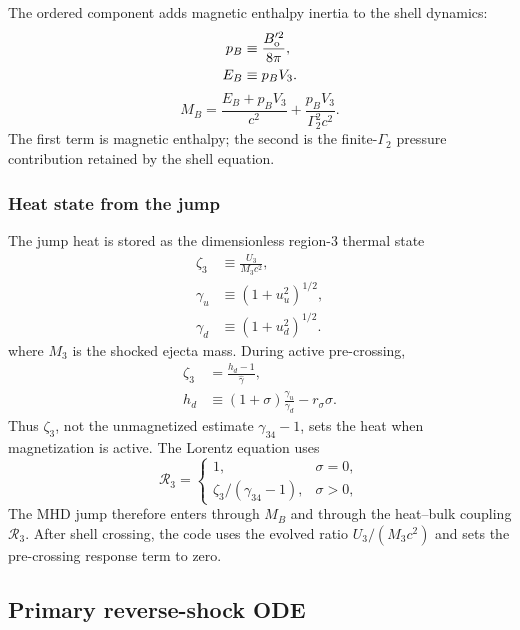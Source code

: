 \documentclass[twocolumn]{aastex702}
\begin{document}
The ordered component adds magnetic enthalpy inertia to the shell dynamics:
\begin{equation}
\begin{aligned}
p_B&\equiv \frac{B_{\rm o}^{\prime 2}}{8\pi},\\
E_B&\equiv p_BV_3 .
\end{aligned}
\end{equation}
\[
M_B=\frac{E_B+p_BV_3}{c^2}+\frac{p_BV_3}{\Gamma_2^2c^2}.
\]
The first term is magnetic enthalpy; the second is the finite-\(\Gamma_2\)
pressure contribution retained by the shell equation.

\subsubsection{Heat state from the jump}

The jump heat is stored as the dimensionless region-3 thermal state
\begin{equation}
\begin{aligned}
\zeta_3&\equiv\frac{U_3}{M_3c^2},\\
\gamma_u&\equiv(1+u_u^2)^{1/2},\\
\gamma_d&\equiv(1+u_d^2)^{1/2}.
\end{aligned}
\end{equation}
where \(M_3\) is the shocked ejecta mass.  During active pre-crossing,
\begin{equation}
\begin{aligned}
\zeta_3&=\frac{h_d-1}{\hat{\gamma}},\\
h_d&\equiv (1+\sigma)\frac{\gamma_u}{\gamma_d}-r_\sigma\sigma .
\end{aligned}
\end{equation}
Thus \(\zeta_3\), not the unmagnetized estimate \(\gamma_{34}-1\), sets the heat
when magnetization is active.  The Lorentz equation uses
\begin{equation}
\mathcal R_3=
\begin{cases}
1, & \sigma=0,\\
\zeta_3/(\gamma_{34}-1), & \sigma>0,
\end{cases}
\end{equation}
The MHD jump therefore enters through \(M_B\) and through the heat--bulk coupling
\(\mathcal R_3\).  After shell crossing, the code uses the evolved ratio
\(U_3/(M_3c^2)\) and sets the pre-crossing response term to zero.

\subsection{Primary reverse-shock ODE}
\end{document}
